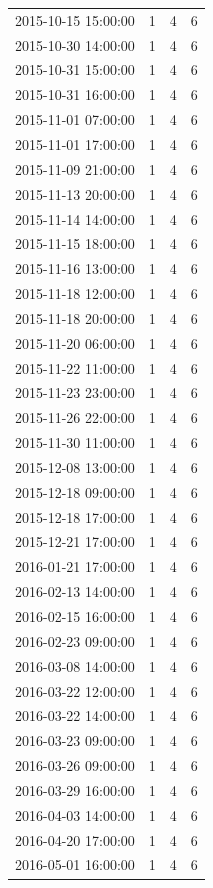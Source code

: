\begin{tabular}{lrrr}
2015-10-15 15:00:00 & 1 & 4 & 6 \\
2015-10-30 14:00:00 & 1 & 4 & 6 \\
2015-10-31 15:00:00 & 1 & 4 & 6 \\
2015-10-31 16:00:00 & 1 & 4 & 6 \\
2015-11-01 07:00:00 & 1 & 4 & 6 \\
2015-11-01 17:00:00 & 1 & 4 & 6 \\
2015-11-09 21:00:00 & 1 & 4 & 6 \\
2015-11-13 20:00:00 & 1 & 4 & 6 \\
2015-11-14 14:00:00 & 1 & 4 & 6 \\
2015-11-15 18:00:00 & 1 & 4 & 6 \\
2015-11-16 13:00:00 & 1 & 4 & 6 \\
2015-11-18 12:00:00 & 1 & 4 & 6 \\
2015-11-18 20:00:00 & 1 & 4 & 6 \\
2015-11-20 06:00:00 & 1 & 4 & 6 \\
2015-11-22 11:00:00 & 1 & 4 & 6 \\
2015-11-23 23:00:00 & 1 & 4 & 6 \\
2015-11-26 22:00:00 & 1 & 4 & 6 \\
2015-11-30 11:00:00 & 1 & 4 & 6 \\
2015-12-08 13:00:00 & 1 & 4 & 6 \\
2015-12-18 09:00:00 & 1 & 4 & 6 \\
2015-12-18 17:00:00 & 1 & 4 & 6 \\
2015-12-21 17:00:00 & 1 & 4 & 6 \\
2016-01-21 17:00:00 & 1 & 4 & 6 \\
2016-02-13 14:00:00 & 1 & 4 & 6 \\
2016-02-15 16:00:00 & 1 & 4 & 6 \\
2016-02-23 09:00:00 & 1 & 4 & 6 \\
2016-03-08 14:00:00 & 1 & 4 & 6 \\
2016-03-22 12:00:00 & 1 & 4 & 6 \\
2016-03-22 14:00:00 & 1 & 4 & 6 \\
2016-03-23 09:00:00 & 1 & 4 & 6 \\
2016-03-26 09:00:00 & 1 & 4 & 6 \\
2016-03-29 16:00:00 & 1 & 4 & 6 \\
2016-04-03 14:00:00 & 1 & 4 & 6 \\
2016-04-20 17:00:00 & 1 & 4 & 6 \\
2016-05-01 16:00:00 & 1 & 4 & 6 \\

\end{tabular}

